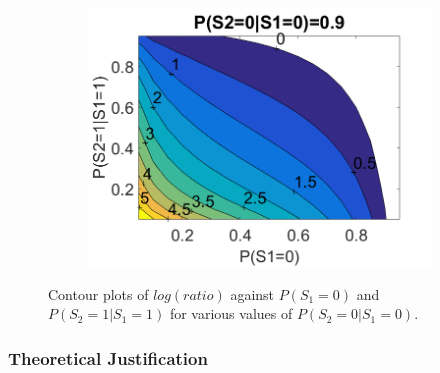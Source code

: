 \documentclass{edm_template}
\begin{document}
\begin{figure}[!ht]
\begin{subfigure}[t]{0.32\linewidth}
				\includegraphics[width=1.05\linewidth]{figures/contour3.png}
				\caption{\label{fig:contour3}}
			\end{subfigure}						
			\caption{Contour plots of $log(ratio)$ against $P(S_1=0)$ and $P(S_2=1|S_1=1)$ for various values of $P(S_2=0|S_1=0)$.\label{fig:contours} }
			\vspace{-1em}
		\end{figure}

\subsubsection{Theoretical Justification}
\label{sec:theory}
\end{document}
